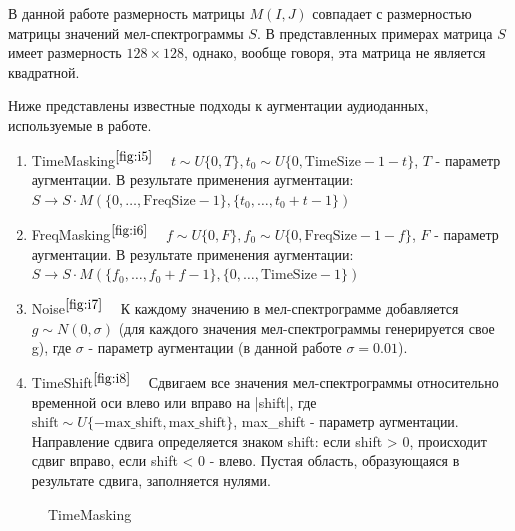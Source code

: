 \documentclass[12pt, fleqn]{article}
\begin{document}
В данной работе размерность матрицы $M(I, J)$ совпадает с размерностью матрицы значений мел-спектрограммы $S$. В представленных примерах матрица $S$ имеет размерность $128\times128$, однако, вообще говоря, эта матрица не является квадратной.

Ниже представлены известные подходы к аугментации аудиоданных, используемые в работе.
\begin{enumerate}
	\item TimeMasking$^{\ref{fig:i5}}$ ~\cite{SpecAugment} \newline 
	$t \sim U\{0, T\}, t_0 \sim U\{0, \text{TimeSize} - 1 - t\}$, $T$ - параметр аугментации. \newline 
	В результате применения аугментации: \newline
	$S \rightarrow S \cdot M(\{0, \ldots, \text{FreqSize} - 1\}, \{t_0, \ldots, t_0 + t - 1\}) $
	\item FreqMasking$^{\ref{fig:i6}}$ ~\cite{SpecAugment} \newline
	$f \sim U\{0, F\}, f_0 \sim U\{0, \text{FreqSize} - 1 - f\}$, $F$ - параметр аугментации. \newline
	В результате применения аугментации: \newline
	$S \rightarrow S \cdot M(\{f_0, \ldots, f_0 + f - 1\}, \{0, \ldots, \text{TimeSize} - 1\}) $
	\item Noise$^{\ref{fig:i7}}$ ~\cite{AudioClassification}  \newline 
	К каждому значению в мел-спектрограмме добавляется $g \sim N(0, \sigma)$ (для каждого значения мел-спектрограммы генерируется свое g), где $\sigma$ - параметр аугментации (в данной работе $\sigma = 0.01$). 
	\item TimeShift$^{\ref{fig:i8}}$ ~\cite{AudioClassification} \newline Сдвигаем все значения мел-спектрограммы относительно временной оси влево или вправо на |shift|, где $\text{shift} \sim U\{-\text{max\_shift}, \text{max\_shift}\}$, max\_shift - параметр аугментации. Направление сдвига определяется знаком shift: если \newline shift > 0, происходит сдвиг вправо, если shift < 0 - влево. Пустая область, образующаяся в результате сдвига, заполняется нулями.
\end{enumerate}

\begin{figure}[ht!]
		\caption{TimeMasking}
		\label{fig:i5}
\end{figure}
\end{document}
